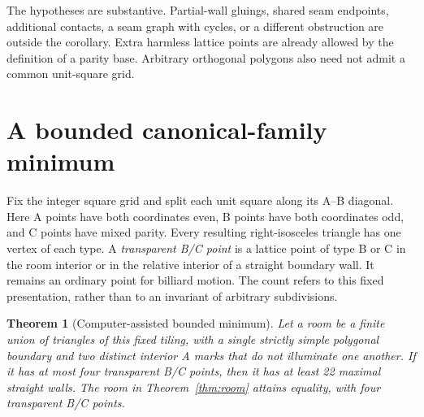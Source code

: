 \documentclass[11pt]{article}
\newtheorem{theorem}{Theorem}
\theoremstyle{definition}\newtheorem{definition}[theorem]{Definition}
\begin{document}
The hypotheses are substantive. Partial-wall gluings, shared seam endpoints, additional contacts, a seam graph with cycles, or a different obstruction are outside the corollary. Extra harmless lattice points are already allowed by the definition of a parity base. Arbitrary orthogonal polygons also need not admit a common unit-square grid.

\section{A bounded canonical-family minimum}

Fix the integer square grid and split each unit square along its A--B diagonal. Here A points have both coordinates even, B points have both coordinates odd, and C points have mixed parity. Every resulting right-isosceles triangle has one vertex of each type. A \emph{transparent B/C point} is a lattice point of type B or C in the room interior or in the relative interior of a straight boundary wall. It remains an ordinary point for billiard motion. The count refers to this fixed presentation, rather than to an invariant of arbitrary subdivisions.

\begin{theorem}[Computer-assisted bounded minimum]\label{thm:bounded}
Let a room be a finite union of triangles of this fixed tiling, with a single strictly simple polygonal boundary and two distinct interior A marks that do not illuminate one another. If it has at most four transparent B/C points, then it has at least 22 maximal straight walls. The room in Theorem~\ref{thm:room} attains equality, with four transparent B/C points.
\end{theorem}
\end{document}
